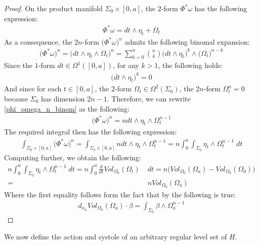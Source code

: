 \documentclass[11pt]{amsart}
\theoremstyle{plain}
\theoremstyle{definition}
\theoremstyle{remark}
\begin{document}
\begin{proof}
   On the product manifold $\Sigma_0 \times [0,a]$, the $2$-form 
   $\Phi^*\omega$ has the following expression:
   \begin{align}\label{Phi_omega_decomp}
       \Phi^*\omega = dt\wedge \eta_t+ \Omega_t
   \end{align}
As a consequence, the $2n$-form $\big(\Phi^*\omega\big)^n$ admits the following binomal expansion:
\begin{align}\label{phi_omega_n_binom}
    \big(\Phi^*\omega\big)^n = \big(dt\wedge \eta_t\wedge\Omega_t\big)^n = \sum^n_{k=0}\binom{n}{k}\big(dt \wedge \eta_t\big)^k \wedge \big(\Omega_t\big)^{n-k}
\end{align}
Since the $1$-form $dt \in \Omega^1([0,a])$, for any $k>1$, the following holds:
\begin{align}
    \big(dt\wedge\eta_t\big)^{k} =0
\end{align}
And since for each $t \in [0,a]$, the $2$-form $\Omega_t \in \Omega^2(\Sigma_0)$, the $2n$-form $\Omega_t^n =0$ because $\Sigma_0$ has dimension $2n-1$. Therefore, we can rewrite \eqref{phi_omega_n_binom} as the following:
\begin{align}
     \big(\Phi^*\omega\big)^n =n dt \wedge \eta_t\wedge \Omega^{n-1}_t
\end{align}
The required integral then has the following expression:
\begin{align}\label{hyp_vol_int_1}
    \int_{\Sigma_0\times [0,a]} \big(\Phi^*\omega\big)^n = \int_{\Sigma_0\times [0,a]} n dt \wedge \eta_t\wedge \Omega^{n-1}_t = n\int^a_0\int_{\Sigma_0}  \eta_t\wedge\Omega^{n-1}_t\;dt 
\end{align}
Computing further, we obtain the following:  
\begin{align}\label{hyp_vol_int_2}
 n\int^a_0\int_{\Sigma_0}  \eta_t\wedge \Omega^{n-1}_t\;dt  = n\int^a_0\frac{d}{dt}Vol_{\Omega_0}(\Omega_t) \; &dt=   n \Big(Vol_{\Omega_0}(\Omega_a) -Vol_{\Omega_0}(\Omega_0)\Big)\\\nonumber = &nVol_{\Omega_0}(\Omega_a)
  \end{align}
  Where the first equality follows form the fact that by \cite{B-K-Odd_Symp} the following is true:
  \begin{align}
      d_{\alpha_a}Vol_{\Omega_0}(\Omega_a)\cdot \beta = \int_{\Sigma_0} \beta \wedge \Omega_a^{n-1} 
  \end{align}
\end{proof}
We now define the action and systole of an arbitrary regular level set of $H$.  \\
\end{document}
